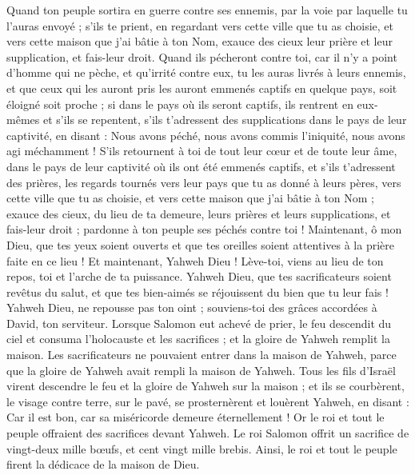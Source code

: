 \begin{multicols}{2}
Quand ton peuple sortira en guerre contre ses ennemis, par la voie par laquelle tu l'auras envoyé ; s'ils te prient, en regardant vers cette ville que tu as choisie, et vers cette maison que j'ai bâtie à ton Nom,
exauce des cieux leur prière et leur supplication, et fais-leur droit.
Quand ils pécheront contre toi, car il n'y a point d'homme qui ne pèche, et qu'irrité contre eux, tu les auras livrés à leurs ennemis, et que ceux qui les auront pris les auront emmenés captifs en quelque pays, soit éloigné soit proche ;
si dans le pays où ils seront captifs, ils rentrent en eux-mêmes et s'ils se repentent, s’ils t’adressent des supplications dans le pays de leur captivité, en disant : Nous avons péché, nous avons commis l'iniquité, nous avons agi méchamment !
S'ils retournent à toi de tout leur cœur et de toute leur âme, dans le pays de leur captivité où ils ont été emmenés captifs, et s'ils t'adressent des prières, les regards tournés vers leur pays que tu as donné à leurs pères, vers cette ville que tu as choisie, et vers cette maison que j'ai bâtie à ton Nom ;
exauce des cieux, du lieu de ta demeure, leurs prières et leurs supplications, et fais-leur droit ; pardonne à ton peuple ses péchés contre toi !
Maintenant, ô mon Dieu, que tes yeux soient ouverts et que tes oreilles soient attentives à la prière faite en ce lieu !
Et maintenant, Yahweh Dieu ! Lève-toi, viens au lieu de ton repos, toi et l'arche de ta puissance. Yahweh Dieu, que tes sacrificateurs soient revêtus du salut, et que tes bien-aimés se réjouissent du bien que tu leur fais !
Yahweh Dieu, ne repousse pas ton oint ; souviens-toi des grâces accordées à David, ton serviteur.
\VerseOne{}Lorsque Salomon eut achevé de prier, le feu descendit du ciel et consuma l'holocauste et les sacrifices ; et la gloire de Yahweh remplit la maison.
Les sacrificateurs ne pouvaient entrer dans la maison de Yahweh, parce que la gloire de Yahweh avait rempli la maison de Yahweh.
Tous les fils d’Israël virent descendre le feu et la gloire de Yahweh sur la maison ; et ils se courbèrent, le visage contre terre, sur le pavé, se prosternèrent et louèrent Yahweh, en disant : Car il est bon, car sa miséricorde demeure éternellement !
Or le roi et tout le peuple offraient des sacrifices devant Yahweh.
Le roi Salomon offrit un sacrifice de vingt-deux mille bœufs, et cent vingt mille brebis. Ainsi, le roi et tout le peuple firent la dédicace de la maison de Dieu.

\end{multicols}
